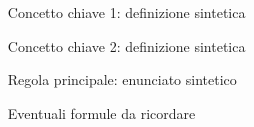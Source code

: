 \begin{riepilogo}
    \begin{itemize}
        \item [Concetto chiave 1: definizione sintetica]
        \item [Concetto chiave 2: definizione sintetica]
        \item [Regola principale: enunciato sintetico]
        \item [Eventuali formule da ricordare]
    \end{itemize}
\end{riepilogo}

